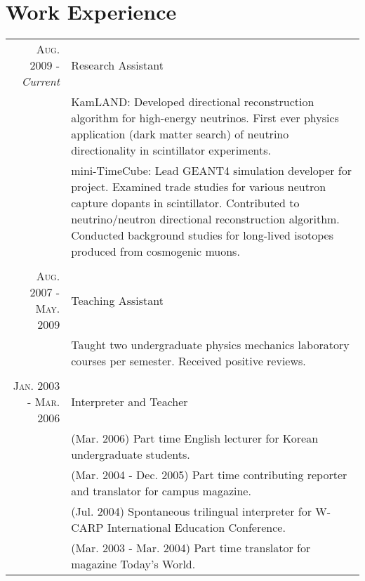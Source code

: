 \documentclass[a4paper,10pt]{article} %
\begin{document}

\section{Work Experience}

\begin{tabular}{r|p{11cm}}
\textsc{Aug. 2009 - }\textit{Current} & Research Assistant\\
& \footnotesize{
	KamLAND: Developed directional reconstruction algorithm for
	high-energy neutrinos.
	First ever physics application (dark matter search) of neutrino
	directionality in scintillator experiments.
}\\
& \footnotesize{
	mini-TimeCube: Lead GEANT4 simulation developer for project.
	Examined trade studies for various neutron capture dopants in
	scintillator.
	Contributed to neutrino/neutron directional reconstruction algorithm.
	Conducted background studies for long-lived isotopes produced from
	cosmogenic muons.
}\\
\multicolumn{2}{c}{} \\


\textsc{Aug. 2007 - May. 2009} & Teaching Assistant\\
& \footnotesize{
	Taught two undergraduate physics mechanics laboratory courses per semester.
	Received positive reviews.
}\\
\multicolumn{2}{c}{} \\


\textsc{Jan. 2003 - Mar. 2006} & Interpreter and Teacher\\
& \footnotesize{(Mar. 2006) Part time English lecturer for Korean undergraduate
students.}\\
& \footnotesize{(Mar. 2004 - Dec. 2005) Part time contributing reporter and
translator for campus magazine.}\\
& \footnotesize{(Jul. 2004) Spontaneous trilingual interpreter for W-CARP
International Education Conference.}\\
& \footnotesize{(Mar. 2003 - Mar. 2004) Part time translator for magazine Today's World.}\\
\end{tabular}
\end{document}
